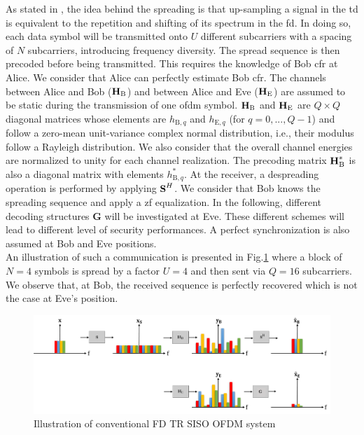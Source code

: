As stated in \cite{nguyen2019frequency}, the idea behind the spreading is that up-sampling a signal in the \gls{td} is equivalent to the repetition and shifting of its spectrum in the \gls{fd}. In doing so, each data symbol will be transmitted onto $U$ different subcarriers with a spacing of $N$ subcarriers, introducing frequency diversity. The spread sequence is then precoded before being transmitted. This requires the knowledge of Bob \gls{cfr} at Alice. We consider that Alice can perfectly estimate Bob \gls{cfr}. The channels between Alice and Bob ($\textbf{H}_{\text{B}}$) and between Alice and Eve ($\textbf{H}_{\text{E}}$) are assumed to be static during the transmission of one \gls{ofdm} symbol. $\textbf{H}_{\text{B}}$ and $\textbf{H}_{\text{E}}$ are $Q\times Q$ diagonal matrices whose elements are $h_{\text{B},q}$ and $h_{\text{E},q}$ (for $q = 0,...,Q-1$) and follow a zero-mean unit-variance complex normal distribution, i.e., their modulus follow a Rayleigh distribution. We also consider that the overall channel energies are normalized to unity for each channel realization. The precoding matrix $\textbf{H}_{\text{B}}^*$ is also a diagonal matrix with elements $h_{\text{B},q}^*$. At the receiver, a despreading operation is performed by applying $\textbf{S}^H$. We consider that Bob knows the spreading sequence and apply a \gls{zf} equalization.  In the following, different decoding structures $\textbf{G}$ will be investigated at Eve. These different schemes will lead to different level of security performances. A perfect synchronization is also assumed at Bob and Eve positions.\\

An illustration of such a communication is presented in Fig.\ref{fig:no_AN_illustration} where a block of $N=4$ symbols is spread by a factor $U=4$ and then sent via $Q=16$ subcarriers. We observe that, at Bob, the received sequence is perfectly recovered which is not the case at Eve's position. 
\begin{figure}[h!]
    \centering
    \includegraphics[width=1\linewidth]{img/scheme_no_AN_illustration.png}
    \caption{Illustration of conventional FD TR SISO OFDM system}
    \label{fig:no_AN_illustration}
\end{figure} 






